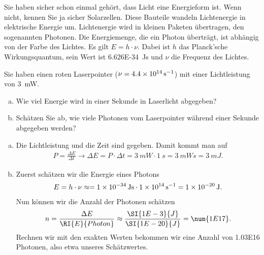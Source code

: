 
\begin{aufgabe}
	Sie haben sicher schon einmal gehört, dass Licht eine Energieform ist. Wenn nicht, kennen Sie ja sicher Solarzellen.
	Diese Bauteile wandeln Lichtenergie in elektrische Energie um. Lichtenergie wird in kleinen Paketen übertragen, den
	sogenannten Photonen. Die Energiemenge, die ein Photon überträgt, ist abhängig von der Farbe des Lichtes.
	Es gilt $E=h\cdot \nu$. Dabei ist $h$ das Planck'sche Wirkungsquantum, sein Wert ist \SI{6.626E-34}{Js} und $\nu$
	die Frequenz des Lichtes.

	Sie haben einen roten Laserpointer ($\nu=\SI{4.4E14}{s^{-1}}$) mit einer Lichtleistung von \SI{3}{mW}.
	\begin{enumerate} [a)]
		\item Wie viel Energie wird in einer Sekunde in Laserlicht abgegeben?
		\item Schätzen Sie ab, wie viele Photonen vom Laserpointer während einer Sekunde abgegeben werden?
	\end{enumerate}
	\begin{loesung}
		\begin{enumerate}[a)]
			\item Die Lichtleistung und die Zeit sind gegeben. Damit kommt man auf
				\begin{eqnarray*}
					P=\frac{\Delta E}{\Delta t} \to \Delta E= P\cdot\Delta t=\SI{3}{mW}\cdot\SI{1}{s}=\SI{3}{mWs}=\SI{3}{mJ}\text{.}
				\end{eqnarray*}
			\item Zuerst schätzen wir die Energie eines Photons
				\begin{eqnarray*}
					E=h\cdot\nu\approx=\SI{1E-34}{Js}\cdot\SI{1E14}{s^{-1}} = \SI{1E-20}{J}\text{.}
				\end{eqnarray*}
Nun können wir die Anzahl der Photonen schätzen
				\begin{eqnarray*}
					n=\frac{\Delta E}{\RI{E}{Photon}}\approx\frac{\SI{1E-3}{J}}{\SI{1E-20}{J}}=\num{1E17}\text{.}
				\end{eqnarray*}
				Rechnen wir mit den exakten Werten bekommen wir eine Anzahl von \num{1.03E16} Photonen, also etwa
				 unseres Schätzwertes.
		\end{enumerate}
	\end{loesung}
\end{aufgabe}
